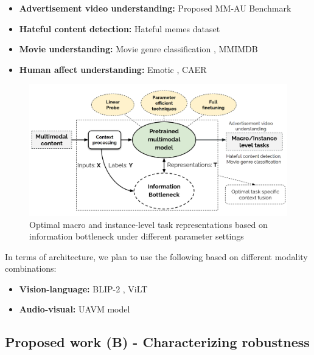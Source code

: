 \begin{itemize}
    \item \textbf{Advertisement video understanding:} Proposed MM-AU Benchmark
    \item \textbf{Hateful content detection:} Hateful memes \cite{Kiela2020TheHM} dataset
    \item \textbf{Movie understanding:}  Movie genre classification \cite{2019Moviescope}, MMIMDB \cite{Arevalo2017GatedMU}
    \item \textbf {Human affect understanding:} Emotic \cite{kostiPAMI}, CAER \cite{CAER-S}
\end{itemize}
\begin{figure}
 \centering 
 \includegraphics[width=\textwidth]{figures/optimal_task_representations.png}
 \caption{Optimal macro and instance-level task representations based on information bottleneck under different parameter settings}
 \label{optimal_task_representations}
\end{figure}

In terms of architecture, we plan to use the following based on different modality combinations:
\begin{itemize}
\item \textbf{Vision-language:} BLIP-2 \cite{Li2023BLIP2BL}, ViLT \cite{Kim2021ViLTVT}
\item \textbf{Audio-visual:} UAVM model \cite{uavm_gong}
\end{itemize}


\subsection{Proposed work (B) - Characterizing robustness}

